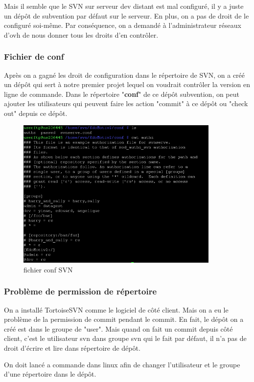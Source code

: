 Mais il semble que le SVN sur serveur dev distant est mal configuré, il y a juste un dépôt de subvention par défaut sur le serveur. En plus, on a pas de droit de le configuré soi-même. Par conséquence, on a demandé  à l'administrateur réseaux d'ovh de nous donner tous les droits d'en contrôler. 

\subsubsection{Fichier de conf}
Après on a gagné les droit de configuration dans le répertoire de SVN, on a créé un dépôt qui sert à notre premier projet lequel on voudrait contrôler la version en ligne de commande. Dans le répertoire "\textbf{conf}" de ce dépôt subvention, on peut ajouter les utilisateurs qui peuvent faire les action "commit" à ce dépôt  ou "check out" depuis ce dépôt. 
\begin{figure}[hbtp]
\centering
\includegraphics[width=10cm]{body/images/conf-svn.png}
\caption{fichier conf SVN}
\end{figure}


\subsubsection{Problème de permission de répertoire }
On a installé TortoiseSVN comme le logiciel de côté client.  Mais on a eu le problème de la permission de commit pendant le commit. En fait, le dépôt on a créé est dans le groupe de "user". Mais quand on fait un commit depuis côté client, c'est le utilisateur svn dans groupe svn qui le fait par défaut, il n'a pas de droit d'écrire et lire dans répertoire de dépôt.

On doit lancé a commande dans linux afin de changer l'utilisateur et le groupe d'une répertoire dans le dépôt. 

